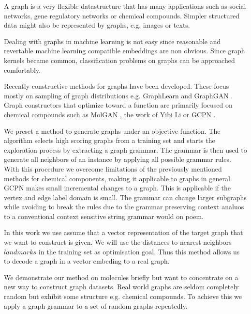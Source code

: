 \documentclass{esannV2} \usepackage[dvips]{graphicx}
\begin{document}
A graph is a very flexible datastructure that has many applications such as
social networks, gene regulatory networks or chemical compounds.  Simpler
structured data might also be represented by graphs, e.g. images or texts.

 Dealing with graphs in
machine learning is not easy since reasonable and revertable machine learning
compatible embeddings are non obvious. Since graph kernels \cite{kernelhist}
became common, classification problems on graphs can be approached comfortably.

Recently constructive methods for graphs have been developed.  These focus
mostly on sampling of graph distributions e.g. GraphLearn \cite{costa16gl}  and
GraphGAN \cite{nngraphsample}. Graph constructors that optimize toward a
function are primarily focused on chemical compounds such as MolGAN
\cite{molgan}, the work of Yibi Li \cite{drgen2018} or GCPN \cite{you2018}.
\newline




We preset a method to generate graphs under an objective function.  The
algorithm selects high scoring graphs from a training set and starts the
exploration process by extracting a graph grammar.   The grammar is then used to generate all neighbors of an instance by
applying all possible grammar rules. With this procedure we overcome
limitations of the previously mentioned methods for chemical components, making
it applicable to graphs in general. GCPN \cite{you2018} makes small incremental
changes to a graph. This is applicable if the vertex and edge label domain is
small.  The grammar can change larger subgraphs while avoiding to break the
rules due to the grammar preserving context analuos to a conventional context
sensitive string grammar \cite{noam} would on poem. 


In this work we use assume that a vector representation of the target graph
that we want to construct is given. We will use the distances to nearest
neighbors $landmarks$  in the training set as optimisation goal. Thus this
method allows us to decode a graph in a vector embeding to a real graph. 

We demonstrate our method on molecules briefly but want to concentrate on a new
way to construct graph datasets. Real world graphs are seldom completely random
\cite{gintro2018} but exhibit some structure e.g. chemical compounds.  To
achieve this we apply a graph grammar to a set of random graphs repeatedly.
\end{document}
